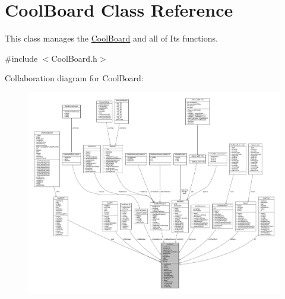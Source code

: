 \hypertarget{class_cool_board}{}\section{Cool\+Board Class Reference}
\label{class_cool_board}


This class manages the \hyperlink{class_cool_board}{Cool\+Board} and all of Its functions.  




{\ttfamily \#include $<$Cool\+Board.\+h$>$}



Collaboration diagram for Cool\+Board\+:
\nopagebreak
\begin{figure}[H]
\begin{center}
\leavevmode
\includegraphics[width=350pt]{class_cool_board__coll__graph}
\end{center}
\end{figure}
